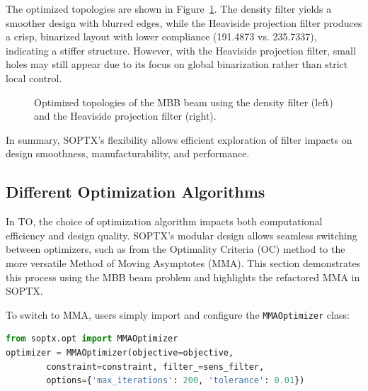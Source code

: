 \documentclass[mathpazo]{cicp}
\begin{document}
The optimized topologies are shown in Figure~\ref{fig:mbb_filter_all}. The density filter yields a smoother design with blurred edges, while the Heaviside projection filter produces a crisp, binarized layout with lower compliance (191.4873 vs. 235.7337), indicating a stiffer structure. However, with the Heaviside projection filter, small holes may still appear due to its focus on global binarization rather than strict local control.
\vspace{-2ex} %
\begin{figure}[htp]
	\centering
	\caption{Optimized topologies of the MBB beam using the density filter (left) and the Heaviside projection filter (right).}
	\label{fig:mbb_filter_all}
\end{figure}
\vspace{-2ex} %

In summary, SOPTX's flexibility allows efficient exploration of filter impacts on design smoothness, manufacturability, and performance.

\subsection{Different Optimization Algorithms}
In TO, the choice of optimization algorithm impacts both computational efficiency and design quality. SOPTX’s modular design allows seamless switching between optimizers, such as from the Optimality Criteria (OC) method to the more versatile Method of Moving Asymptotes (MMA). This section demonstrates this process using the MBB beam problem and highlights the refactored MMA in SOPTX.

To switch to MMA, users simply import and configure the \texttt{MMAOptimizer} class:
\vspace{-0.5ex} %
\begin{lstlisting}[language=python]
from soptx.opt import MMAOptimizer
optimizer = MMAOptimizer(objective=objective, 
		constraint=constraint, filter_=sens_filter,
		options={'max_iterations': 200, 'tolerance': 0.01})
\end{lstlisting}
\vspace{-0.5ex} %
\end{document}
